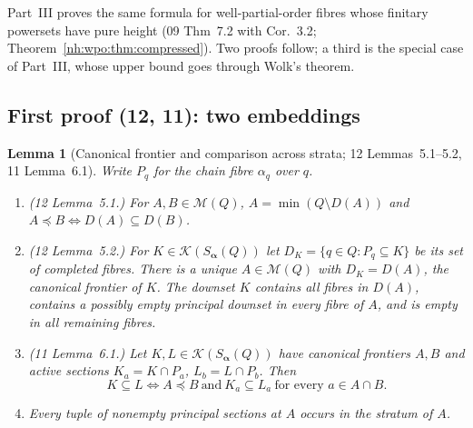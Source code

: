 \documentclass[11pt,a4paper]{article}
\newtheorem{lemma}[theorem]{Lemma}
\theoremstyle{definition}
\theoremstyle{remark}
\newcommand{\K}{\mathcal K}
\newcommand{\M}{\mathcal M}
\begin{document}
Part~III proves the same formula for well-partial-order fibres whose
finitary powersets have pure height (09 Thm~7.2 with Cor.~3.2;
Theorem~\ref{nh:wpo:thm:compressed}). Two proofs follow; a third is the
special case of Part~III, whose upper bound goes through Wolk's theorem.

\subsection{First proof (12, 11): two embeddings}

\begin{lemma}[Canonical frontier and comparison across strata; 12 Lemmas~5.1--5.2, 11 Lemma~6.1]\label{nh:lem:canonicalcompare}
Write $P_q$ for the chain fibre $\alpha_q$ over $q$.
\begin{enumerate}[label=(\roman*)]
\item \textup{(12 Lemma~5.1.)} For $A,B\in\M(Q)$, $A=\min(Q\setminus D(A))$
and $A\preceq B\iff D(A)\subseteq D(B)$.
\item \textup{(12 Lemma~5.2.)} For $K\in\K(S_{\boldsymbol\alpha}(Q))$ let
$D_K=\{q\in Q:P_q\subseteq K\}$ be its set of completed fibres. There is a
unique $A\in\M(Q)$ with $D_K=D(A)$, the \emph{canonical frontier} of $K$. The
downset $K$ contains all fibres in $D(A)$, contains a possibly empty principal
downset in every fibre of $A$, and is empty in all remaining fibres.
\item \textup{(11 Lemma~6.1.)} Let $K,L\in\K(S_{\boldsymbol\alpha}(Q))$ have
canonical frontiers $A,B$ and active sections $K_a=K\cap P_a$,
$L_b=L\cap P_b$. Then
\begin{equation}\label{nh:eq:canonicalcompare}
 K\subseteq L\iff A\preceq B\ \text{and}\ K_a\subseteq L_a
 \ \text{for every }a\in A\cap B .
\end{equation}
\item Every tuple of nonempty principal sections at $A$ occurs in the stratum
of $A$.
\end{enumerate}
\end{lemma}
\end{document}
